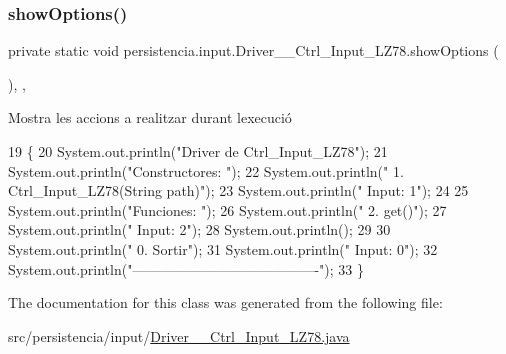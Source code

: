 \subsubsection{\texorpdfstring{show\+Options()}{showOptions()}}
{\footnotesize\ttfamily private static void persistencia.\+input.\+Driver\+\_\+\+\_\+\+Ctrl\+\_\+\+Input\+\_\+\+L\+Z78.\+show\+Options (\begin{DoxyParamCaption}{ }\end{DoxyParamCaption})\hspace{0.3cm}{\ttfamily [inline]}, {\ttfamily [static]}, {\ttfamily [private]}}



Mostra les accions a realitzar durant l\textquotesingle{}execució 


\begin{DoxyCode}
19                                      \{
20         System.out.println(\textcolor{stringliteral}{"Driver de Ctrl\_Input\_LZ78"});
21         System.out.println(\textcolor{stringliteral}{"Constructores: "});
22         System.out.println(\textcolor{stringliteral}{"     1. Ctrl\_Input\_LZ78(String path)"});
23         System.out.println(\textcolor{stringliteral}{"     Input: 1"});
24 
25         System.out.println(\textcolor{stringliteral}{"Funciones: "});
26         System.out.println(\textcolor{stringliteral}{"     2. get()"});
27         System.out.println(\textcolor{stringliteral}{"     Input: 2"});
28         System.out.println();
29 
30         System.out.println(\textcolor{stringliteral}{"     0. Sortir"});
31         System.out.println(\textcolor{stringliteral}{"     Input: 0"});
32         System.out.println(\textcolor{stringliteral}{"----------------------------------------"});
33     \}
\end{DoxyCode}


The documentation for this class was generated from the following file\+:\begin{DoxyCompactItemize}
\item 
src/persistencia/input/\hyperlink{Driver____Ctrl__Input__LZ78_8java}{Driver\+\_\+\+\_\+\+Ctrl\+\_\+\+Input\+\_\+\+L\+Z78.\+java}\end{DoxyCompactItemize}
